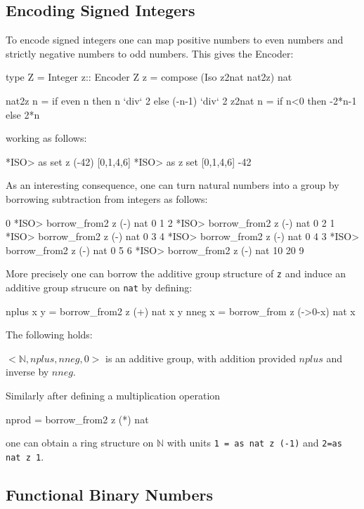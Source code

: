 \documentclass[]{INCLUDES/llncs}
\begin{document}
\subsection{Encoding Signed Integers}
To encode signed integers one can map positive numbers to even numbers and
strictly negative numbers to odd numbers. This gives the Encoder:
\begin{code}
type Z = Integer
z:: Encoder Z
z = compose (Iso z2nat nat2z) nat

nat2z n = if even n then n `div` 2 else (-n-1) `div` 2
z2nat n = if n<0 then -2*n-1 else 2*n
\end{code}
working as follows:
\begin{codex}
*ISO> as set z (-42)
[0,1,4,6]
*ISO> as z set [0,1,4,6]
-42
\end{codex}
As an interesting consequence, one can turn natural numbers into a {\em} group
by borrowing subtraction from integers as follows:
\begin{codex}
0
*ISO> borrow_from2 z (-) nat 0 1
2
*ISO> borrow_from2 z (-) nat 0 2
1
*ISO> borrow_from2 z (-) nat 0 3
4
*ISO> borrow_from2 z (-) nat 0 4
3
*ISO> borrow_from2 z (-) nat 0 5
6
*ISO> borrow_from2 z (-) nat 10 20
9
\end{codex}
More precisely one can borrow the additive group structure of {\tt z} and
induce an additive group strucure on {\tt nat} by defining:
\begin{code}
nplus x y = borrow_from2 z (+) nat x y
nneg x = borrow_from z (\x->0-x) nat x
\end{code}
The following holds:
\begin{prop}
$<\mathbb{N},nplus,nneg,0>$ is an additive group, with addition provided $nplus$ and
inverse by $nneg$.
\end{prop}
Similarly after defining a multiplication operation
\begin{code}
nprod = borrow_from2 z (*) nat
\end{code}
one can obtain a ring structure on $\mathbb{N}$ with units {\tt 1 = as nat z (-1)} and
{\tt 2=as nat z 1}.


\subsection{Functional Binary Numbers}
\end{document}
